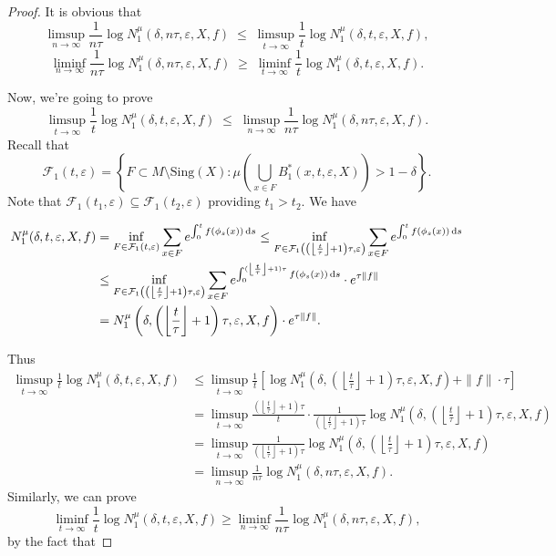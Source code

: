 \documentclass[10pt]{article}
\newtheorem*{Theorem A}{Theorem A}
\begin{document}
\begin{proof} It is obvious that
\[
\limsup_{n \to \infty} \frac{1}{n\tau} \log N_1^\mu(\delta, n\tau, \varepsilon, X, f)
\;\leq\;
\limsup_{t \to \infty} \frac{1}{t} \log N_1^\mu(\delta, t, \varepsilon, X, f),
\]
\[
\liminf_{n \to \infty} \frac{1}{n\tau} \log N_1^\mu(\delta, n\tau, \varepsilon, X, f)
\;\geq\;
\liminf_{t \to \infty} \frac{1}{t} \log N_1^\mu(\delta, t, \varepsilon, X, f).
\]


\noindent
Now, we're going to prove
\[
\limsup_{t \to \infty} \frac{1}{t} \log N_1^\mu(\delta, t, \varepsilon, X, f)
\;\leq\;
\limsup_{n \to \infty} \frac{1}{n\tau} \log N_1^\mu(\delta, n\tau, \varepsilon, X, f).
\]
Recall that
\[
\mathcal{F}_1(t, \varepsilon)
= \left\{
F \subset M \setminus \text{Sing}(X)
:
\mu\left( \bigcup_{x \in F} B_1^*(x, t, \varepsilon, X) \right) > 1 - \delta
\right\}.
\]
Note that \( \mathcal{F}_1(t_1, \varepsilon) \subseteq \mathcal{F}_1(t_2, \varepsilon) \) providing \( t_1 > t_2 \). We have


\begin{align*}
N_1^\mu(\delta, t, \varepsilon, X, f)
&= \inf_{\substack{F \in \mathcal{F}_1(t, \varepsilon) }}
\sum_{x \in F} e^{\int_0^t f(\phi_s(x)) \, {\rm d}s}\leq \inf_{\substack{F \in \mathcal{F}_1\left(\left( \left\lfloor \frac{t}{\tau} \right\rfloor+1\right) \tau, \varepsilon \right) }}
\sum_{x \in F} e^{\int_0^t f(\phi_s(x)) \, {\rm d}s} \\
&\leq \inf_{\substack{F \in \mathcal{F}_1\left(\left( \left\lfloor \frac{t}{\tau} \right\rfloor+1\right) \tau, \varepsilon \right) }}
\sum_{x \in F} e^{\int_0^{( \left\lfloor \frac{t}{\tau} \right\rfloor+1) \tau } f(\phi_s(x)) \, {\rm d}s  }\cdot e^{\tau\|f\|  } \\
&= N_1^\mu\left( \delta, \left(\left\lfloor \frac{t}{\tau} \right\rfloor+1\right) \tau, \varepsilon, X, f \right)
\cdot e^{\tau\|f\|  }.
\end{align*}

\noindent
Thus
\begin{align*}
\limsup_{t \to \infty}  \frac{1}{t}\log N_1^\mu(\delta, t, \varepsilon, X, f)
&\leq \limsup_{t \to \infty} \frac{1}{t} \left[ \log N_1^\mu\left( \delta, \left(\left\lfloor \frac{t}{\tau} \right\rfloor+1\right) \tau, \varepsilon, X, f \right) + \|f\| \cdot \tau \right] \\
&= \limsup_{t \to \infty} \frac{\left(\left\lfloor \frac{t}{\tau} \right\rfloor+1\right) \tau}{t}
\cdot \frac{1}{\left(\left\lfloor \frac{t}{\tau} \right\rfloor+1\right) \tau} \log N_1^\mu\left( \delta, \left(\left\lfloor \frac{t}{\tau} \right\rfloor+1\right) \tau, \varepsilon, X, f \right) \\
&= \limsup_{t \to \infty} \frac{1}{\left(\left\lfloor \frac{t}{\tau} \right\rfloor+1\right) \tau} \log N_1^\mu\left( \delta,\left(\left\lfloor \frac{t}{\tau} \right\rfloor+1\right) \tau, \varepsilon, X, f \right) \\
&= \limsup_{n \to \infty} \frac{1}{n\tau} \log N_1^\mu(\delta, n\tau, \varepsilon, X, f).
\end{align*}
Similarly, we can prove
\[\liminf_{t \to \infty}  \frac{1}{t}\log N_1^\mu(\delta, t, \varepsilon, X, f)\geq\liminf_{n \to \infty} \frac{1}{n\tau} \log N_1^\mu(\delta, n\tau, \varepsilon, X, f), \]
by the fact that


\end{proof}
\end{document}
